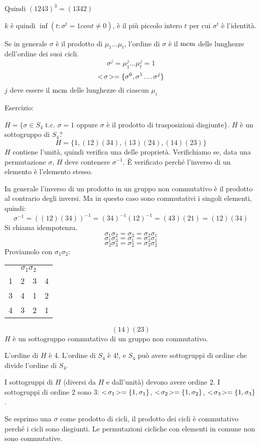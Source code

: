 Quindi $(1 2 4 3)^3 = (1 3 4 2)$

$k$ \`e quindi $\inf (t : \sigma^t = 1 con t \neq 0)$, \`e il pi\`u piccolo intero $t$ per cui $\sigma^t$ \`e l'identit\`a.

Se in generale $\sigma$ \`e il prodotto di $\mu_1 \dots \mu_t$, l'ordine di $\sigma$ \`e il $\operatorname{mcm}$ delle lunghezze dell'ordine dei suoi cicli.
\[
\sigma^j = \mu_1^j \dots \mu_t^j = 1
\]
\[
<\!{\sigma}\!> = \{ \sigma^0, \sigma^1 \dots \sigma^j \}
\]
$j$ deve essere il $\operatorname{mcm}$ delle lunghezze di ciascun $\mu_i$

Esercizio:

$H = \{ \sigma \in S_4$ t.c. $\sigma = 1$ oppure $\sigma$ \`e il prodotto di trasposizioni disgiunte$ \}$. $H$ \`e un sottogruppo di $S_4$?
\[
H = \{ 1, (1 2) (3 4), (1 3) (2 4), (1 4) (2 3) \}
\]
$H$ contiene l'unit\`a, quindi verifica una delle propriet\`a. Verifichiamo se, data una permutazione $\sigma$, $H$ deve contenere $\sigma^{-1}$. \`E verificato perch\'e l'inverso di un elemento \`e l'elemento stesso.

In generale l'inverso di un prodotto in un gruppo non commutativo \`e il prodotto al contrario degli inversi. Ma in questo caso sono commutativi i singoli elementi, quindi:
\[
\sigma^{-1} = ((1 2) (3 4) )^{-1} = (3 4)^{-1} (1 2)^{-1} = (4 3) (2 1) = (1 2) (3 4)
\]
Si chiama idempotenza.
\[
\sigma_1 \sigma_2 = \sigma_3 = \sigma_2 \sigma_1
\]
\[
\sigma_1 \sigma_3 = \sigma_1 = \sigma_3 \sigma_1
\]
\[
\sigma_2 \sigma_3 = \sigma_2 = \sigma_3 \sigma_2
\]
Proviamolo con $\sigma_1 \sigma_2$:

\begin{tabular}{*{4}{c}}
\multicolumn{4}{c}{$\sigma_1 \sigma_2$} \\
1 & 2 & 3 & 4 \\
3 & 4 & 1 & 2 \\
4 & 3 & 2 & 1
\end{tabular}
\[
(1 4) (2 3)
\]
$H$ \`e un sottogruppo commutativo di un gruppo non commutativo.

L'ordine di $H$ \`e 4. L'ordine di $S_4$ \`e $4!$, e $S_4$ pu\`o avere sottogruppi di ordine che divide l'ordine di $S_4$.

I sottogruppi di $H$ (diversi da $H$ e dall'unit\`a) devono avere ordine 2. I sottogruppi di ordine 2 sono 3: $<\!{\sigma_1}\!> = \{ 1, \sigma_1\}$, $<\!{\sigma_2}\!> = \{1, \sigma_2\}$, $<\!{\sigma_3}\!> = \{1, \sigma_3 \}$.

Se esprimo una $\sigma$ come prodotto di cicli, il prodotto dei cicli \`e commutativo perch\'e i cicli sono disgiunti. Le permutazioni cicliche con elementi in comune non sono commutative.

